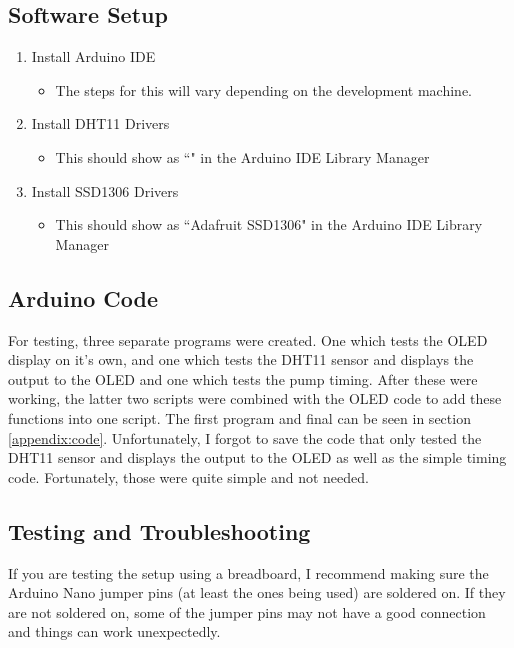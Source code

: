 \documentclass{article}
\begin{document}
\begin{multicols}{2}
		\subsection{Software Setup}
		\begin{enumerate}
			\item Install Arduino IDE
			\begin{itemize}
				\item The steps for this will vary depending on the development machine.
			\end{itemize}
			\item Install DHT11 Drivers
			\begin{itemize}
				\item This should show as ``" in the Arduino IDE Library Manager
			\end{itemize}
			\item Install SSD1306 Drivers
			\begin{itemize}
				\item This should show as ``Adafruit SSD1306" in the Arduino IDE Library Manager
			\end{itemize}
		\end{enumerate}
		
		\subsection{Arduino Code}
		For testing, three separate programs were created. One which tests the OLED display on it's own, and one which tests the DHT11 sensor and displays the output to the OLED and one which tests the pump timing. After these were working, the latter two scripts were combined with the OLED code to add these functions into one script. The first program and final can be seen in section \ref{appendix:code}. Unfortunately, I forgot to save the code that only tested the DHT11 sensor and displays the output to the OLED as well as the simple timing code. Fortunately, those were quite simple and not needed.
		
		\subsection{Testing and Troubleshooting}
		If you are testing the setup using a breadboard, I recommend making sure the Arduino Nano jumper pins (at least the ones being used) are soldered on. If they are not soldered on, some of the jumper pins may not have a good connection and things can work unexpectedly.
		

\end{multicols}
\end{document}
